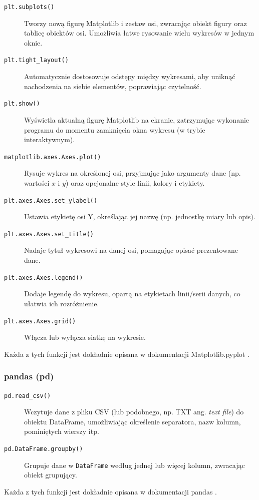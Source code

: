\documentclass[a4paper,twoside,12pt]{book}
\newcommand{\obcy}[1]{\emph{#1}}
\newcommand{\english}[1]{{\selectlanguage{british}\obcy{#1}}}
\begin{document}
\begin{description}
	\item[\texttt{plt.subplots()}] Tworzy nową figurę Matplotlib i zestaw osi, zwracając obiekt figury oraz tablicę obiektów osi. Umożliwia łatwe rysowanie wielu wykresów w jednym oknie.
	\item[\texttt{plt.tight\_layout()}] Automatycznie dostosowuje odstępy między wykresami, aby uniknąć nachodzenia na siebie elementów, poprawiając czytelność.
	\item[\texttt{plt.show()}] Wyświetla aktualną figurę Matplotlib na ekranie, zatrzymując wykonanie programu do momentu zamknięcia okna wykresu (w trybie interaktywnym).
	\item[\texttt{matplotlib.axes.Axes.plot()}] Rysuje wykres na określonej osi, przyjmując jako argumenty dane (np. wartości $x$ i $y$) oraz opcjonalne style linii, kolory i etykiety.
	\item[\texttt{plt.axes.Axes.set\_ylabel()}] Ustawia etykietę osi Y, określając jej nazwę (np. jednostkę miary lub opis).
	\item[\texttt{plt.axes.Axes.set\_title()}] Nadaje tytuł wykresowi na danej osi, pomagając opisać prezentowane dane.
	\item[\texttt{plt.axes.Axes.legend()}] Dodaje legendę do wykresu, opartą na etykietach linii/serii danych, co ułatwia ich rozróżnienie.
	\item[\texttt{plt.axes.Axes.grid()}] Włącza lub wyłącza siatkę na wykresie.
\end{description}

Każda z tych funkcji jest dokładnie opisana w dokumentacji Matplotlib.pyplot \cite{bib:matplotlib-pyplot-funkcje}.

\subsubsection{pandas (pd)}

\begin{description}
	\item[\texttt{pd.read\_csv()}] Wczytuje dane z pliku CSV (lub podobnego, np. TXT ang. \english{text file}) do obiektu DataFrame, umożliwiając określenie separatora, nazw kolumn, pominiętych wierszy itp.
	\item[\texttt{pd.DataFrame.groupby()}] Grupuje dane w \texttt{DataFrame} według jednej lub więcej kolumn, zwracając obiekt grupujący.
\end{description}

Każda z tych funkcji jest dokładnie opisana w dokumentacji pandas \cite{bib:pandas-funkcje}.
\end{document}
